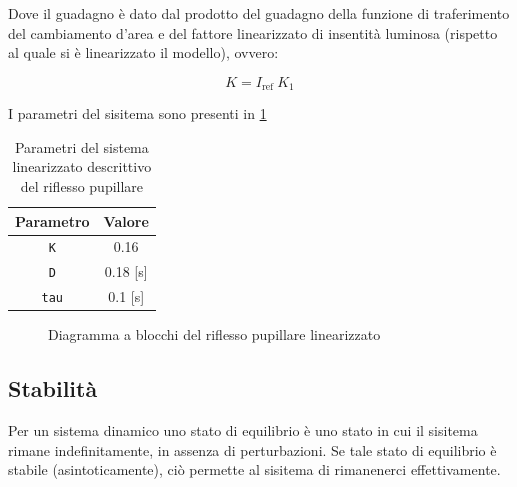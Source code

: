 Dove il guadagno è dato dal prodotto del guadagno della funzione di traferimento del cambiamento d'area e del fattore linearizzato di insentità luminosa (rispetto al quale si è linearizzato il modello), ovvero:

\begin{equation}
	K=I_{\text {ref }} K_{1}
\end{equation}

I parametri del sisitema sono presenti in \cref{tab:pupilla}

\begin{table}[t!]
	\centering
	\begin{tabular}{|c|c|}
		\hline
		Parametro & Valore \\
		\hline
		\texttt{K} & 0.16 \\
		\hline
		\texttt{D} & 0.18 [s] \\
		\hline
		\texttt{tau} & 0.1 [s] \\
		\hline
	\end{tabular}
	\caption{Parametri del sistema linearizzato descrittivo del riflesso pupillare}
	\label{tab:pupilla}
\end{table}


\begin{figure}[h!]
	\centering
	\begin{subfigure}{0.6\linewidth}
\centering
	\tiny{\def\svgwidth{0.95\linewidth}
	}
\caption{}
	\end{subfigure}\hfill
	\begin{subfigure}{0.4\linewidth}
	\centering
	\tiny{\def\svgwidth{0.95\linewidth}
		}
	\caption{}
\end{subfigure}
	\caption{}
	\label{fig:pupilla}
\end{figure}



\begin{figure}[h!]
	\centering
	\footnotesize{\def\svgwidth{0.95\linewidth}
	}
\caption{Diagramma a blocchi del riflesso pupillare linearizzato}
\end{figure}


\subsection{Stabilità}

Per un sistema dinamico uno stato di equilibrio è uno stato in cui il sisitema rimane indefinitamente, in assenza di perturbazioni. Se tale stato di equilibrio è stabile (asintoticamente), ciò permette al sisitema di rimanenerci effettivamente. 

